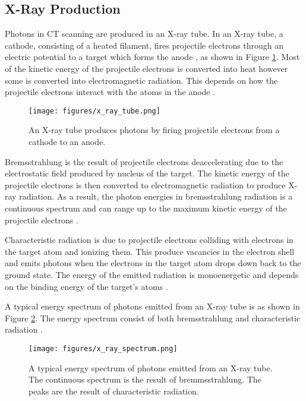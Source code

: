 \documentclass[12pt, a4paper]{memoir}
\begin{document}
\subsection{X-Ray Production}
Photons in CT scanning are produced in an X-ray tube. In an X-ray tube, a cathode, consisting of a heated filament, fires projectile electrons through an electric potential to a target which forms the anode \citep{michael2001x}, as shown in Figure \ref{fig:x_ray_tube}. Most of the kinetic energy of the projectile electrons is converted into heat however some is converted into electromagnetic radiation. This depends on how the projectile electrons interact with the atoms in the anode \citep{cantatore2011introduction}.

\begin{figure}
	\centering
	\texttt{[image: figures/x\_ray\_tube.png]}
	\caption{An X-ray tube produces photons by firing projectile electrons from a cathode to an anode. \citep{michael2001x}}
	\label{fig:x_ray_tube}
\end{figure}

Bremsstrahlung is the result of projectile electrons deaccelerating due to the electrostatic field produced by nucleus of the target. The kinetic energy of the projectile electrons is then converted to electromagnetic radiation to produce X-ray radiation. As a result, the photon energies in bremsstrahlung radiation is  a continuous spectrum and can range up to the maximum kinetic energy of the projectile electrons \citep{michael2001x}.

Characteristic radiation is due to projectile electrons colliding with electrons in the target atom and ionizing them. This produce vacancies in the electron shell and emits photons when the electrons in the target atom drops down back to the ground state. The energy of the emitted radiation is monoenergetic and depends on the binding energy of the target's atoms \citep{michael2001x}.

A typical energy spectrum of photons emitted from an X-ray tube is as shown in Figure \ref{fig:x_ray_spectrum}. The energy spectrum consist of both bremsstrahlung and characteristic radiation \citep{michael2001x}.

\begin{figure}
	\centering
	\texttt{[image: figures/x\_ray\_spectrum.png]}
	\caption{A typical energy spectrum of photons emitted from an X-ray tube. The continuous spectrum is the result of bremmsstrahlung. The peaks are the result of characteristic radiation. \citep{michael2001x}}
	\label{fig:x_ray_spectrum}
\end{figure}
\end{document}
